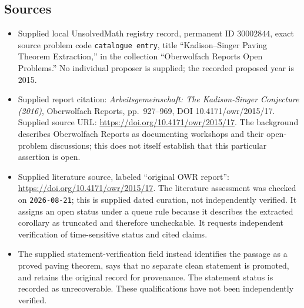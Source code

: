 \documentclass[11pt]{article}
\begin{document}
\subsection{Sources}
\begin{itemize}
\item Supplied local UnsolvedMath registry record, permanent ID \(30002844\), exact source problem code \texttt{catalogue entry}, title ``Kadison--Singer Paving Theorem Extraction,'' in the collection ``Oberwolfach Reports Open Problems.'' No individual proposer is supplied; the recorded proposed year is 2015.
\item Supplied report citation: \emph{Arbeitsgemeinschaft: The Kadison-Singer Conjecture (2016)}, Oberwolfach Reports, pp.~927--969, DOI 10.4171/owr/2015/17. Supplied source URL: \url{https://doi.org/10.4171/owr/2015/17}. The background describes Oberwolfach Reports as documenting workshops and their open-problem discussions; this does not itself establish that this particular assertion is open.
\item Supplied literature source, labeled ``original OWR report'': \url{https://doi.org/10.4171/owr/2015/17}. The literature assessment was checked on \texttt{2026-08-21}; this is supplied dated curation, not independently verified. It assigns an open status under a queue rule because it describes the extracted corollary as truncated and therefore uncheckable. It requests independent verification of time-sensitive status and cited claims.
\item The supplied statement-verification field instead identifies the passage as a proved paving theorem, says that no separate clean statement is promoted, and retains the original record for provenance. The statement status is recorded as unrecoverable. These qualifications have not been independently verified.
\end{itemize}
\end{document}
